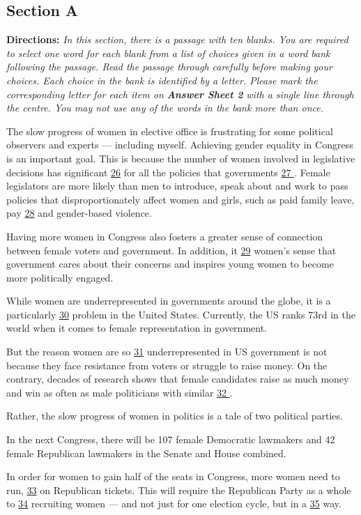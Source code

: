 \documentclass[UTF8,11pt]{ctexart}
\begin{document}
\subsection*{\textbf{Section A}}


\textbf{Directions:} \textit{In this section, there is a passage with ten blanks. You are required to select one word for each blank} \textit{from a list of choices given in a word bank following the passage. Read the passage through carefully before making} \textit{your choices. Each choice in the bank is identified by a letter. Please mark the corresponding letter for each item on} \textbf{\textit{Answer Sheet 2}}\textit{ with a single line through the centre. You may not use any of the words in the bank more than once.}


The slow progress of women in elective office is frustrating for some political observers and experts — including myself. Achieving gender equality in Congress is an important goal. This is because the number of women involved in legislative decisions has significant \uline{26} for all the policies that governments \uline{27 }. Female legislators are more likely than men to introduce, speak about and work to pass policies that disproportionately affect women and girls, such as paid family leave, pay \uline{28} and gender-based violence.


Having more women in Congress also fosters a greater sense of connection between female voters and government. In addition, it \uline{29} women’s sense that government cares about their concerns and inspires young women to become more politically engaged.


While women are underrepresented in governments around the globe, it is a particularly \uline{30} problem in the United States. Currently, the US ranks 73rd in the world when it comes to female representation in government.


But the reason women are so \uline{31} underrepresented in US government is not because they face resistance from voters or struggle to raise money. On the contrary, decades of research shows that female candidates raise as much money and win as often as male politicians with similar \uline{32 }.


Rather, the slow progress of women in politics is a tale of two political parties.


In the next Congress, there will be 107 female Democratic lawmakers and 42 female Republican lawmakers in the Senate and House combined.


In order for women to gain half of the seats in Congress, more women need to run, \uline{33} on Republican tickets. This will require the Republican Party as a whole to \uline{34} recruiting women — and not just for one election cycle, but in a \uline{35} way.
\end{document}
